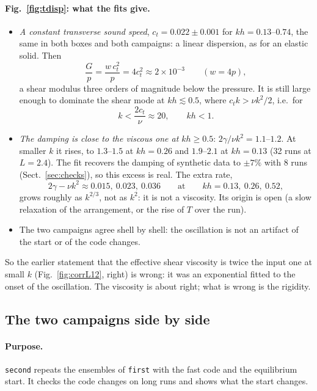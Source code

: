 \documentclass[11pt,aps,preprint,nofootinbib,superscriptaddress,tightenlines]{revtex4-2}
\def\st{\begin{equation}}
\def\stp{\end{equation}}
\def\Sect#1{Sect.~\ref{#1}}
\def\Fig#1{Fig.~\ref{#1}}
\let\oldparagraph\paragraph
\renewcommand{\paragraph}{\par\bigskip\oldparagraph}
\begin{document}
\paragraph{\Fig{fig:tdisp}: what the fits give.}
\begin{itemize}
\item \emph{A constant transverse sound speed}, $c_t=0.022\pm0.001$ for $kh=0.13$--$0.74$,
  the same in both boxes and both campaigns: a linear dispersion, as for an elastic solid.
  Then
  \st
  \frac{G}{p}=\frac{w\,c_t^2}{p}=4c_t^2\approx2\times10^{-3}\qquad(w=4p),
  \stp
  a shear modulus three orders of magnitude below the pressure.  It is still large enough to
  dominate the shear mode at $kh\lesssim0.5$, where $c_tk>\nu k^2/2$, i.e.\ for
  \st
  k<\frac{2c_t}{\nu}\approx20,\qquad kh<1 .
  \stp
\item \emph{The damping is close to the viscous one at $kh\ge0.5$}: $2\gamma/\nu k^2=1.1$--$1.2$.
  At smaller $k$ it rises, to $1.3$--$1.5$ at $kh=0.26$ and $1.9$--$2.1$ at $kh=0.13$ (32 runs at
  $L=2.4$).  The fit recovers the damping of synthetic data to $\pm7\%$ with 8 runs
  (\Sect{sec:checks}), so this excess is real.  The extra rate,
  \st
  2\gamma-\nu k^2\approx0.015,\ 0.023,\ 0.036\qquad\text{at}\qquad kh=0.13,\ 0.26,\ 0.52,
  \stp
  grows roughly as $k^{2/3}$, not as $k^2$: it is not a viscosity.  Its origin is open
  (a slow relaxation of the arrangement, or the rise of $T$ over the run).
\item The two campaigns agree shell by shell: the oscillation is not an artifact of the
  start or of the code changes.
\end{itemize}
So the earlier statement that the effective shear viscosity is twice the input one at small
$k$ (\Fig{fig:corrL12}, right) is wrong: it was an exponential fitted to the onset of the
oscillation.  The viscosity is about right; what is wrong is the rigidity.

\subsection{The two campaigns side by side}
\label{sec:compare}

\paragraph{Purpose.}  \texttt{second} repeats the ensembles of \texttt{first} with the fast
code and the equilibrium start.  It checks the code changes on long runs and shows what the
start changes.
\end{document}
